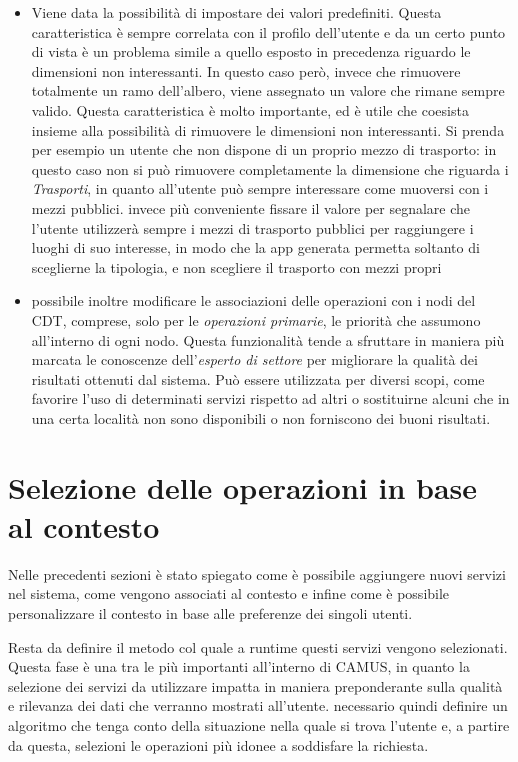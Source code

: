 \begin{itemize}
	\item
	Viene data la possibilità di impostare dei valori predefiniti. Questa caratteristica è sempre correlata con il profilo dell'utente e da un certo punto di vista è un problema simile a quello esposto in precedenza riguardo le dimensioni non interessanti. In questo caso però, invece che rimuovere totalmente un ramo dell'albero, viene assegnato un valore che rimane sempre valido. Questa caratteristica è molto importante, ed è utile che coesista insieme alla possibilità di rimuovere le dimensioni non interessanti. Si prenda per esempio un utente che non dispone di un proprio mezzo di trasporto: in questo caso non si può rimuovere completamente la dimensione che riguarda i \emph{Trasporti}, in quanto all'utente può sempre interessare come muoversi con i mezzi pubblici. \upe invece più conveniente fissare il valore  per segnalare che l'utente utilizzerà sempre i mezzi di trasporto pubblici per raggiungere i luoghi di suo interesse, in modo che la app generata permetta soltanto di sceglierne la tipologia, e non scegliere il trasporto con mezzi propri
	\item
	\upe possibile inoltre modificare le associazioni delle operazioni con i nodi del CDT, comprese, solo per le \emph{operazioni primarie}, le priorità che assumono all'interno di ogni nodo. Questa funzionalità tende a sfruttare in maniera più marcata le conoscenze dell'\emph{esperto di settore} per migliorare la qualità dei risultati ottenuti dal sistema. Può essere utilizzata per diversi scopi, come favorire l'uso di determinati servizi rispetto ad altri o sostituirne alcuni che in una certa località non sono disponibili o non forniscono dei buoni risultati.
\end{itemize}

\section{Selezione delle operazioni in base al contesto\label{sec:selezione-operazioni}}

Nelle precedenti sezioni è stato spiegato come è possibile aggiungere nuovi servizi nel sistema, come vengono associati al contesto e infine come è possibile personalizzare il contesto in base alle preferenze dei singoli utenti.

Resta da definire il metodo col quale a runtime questi servizi vengono selezionati. Questa fase è una tra le più importanti all'interno di CAMUS, in quanto la selezione dei servizi da utilizzare impatta in maniera preponderante sulla qualità e rilevanza dei dati che verranno mostrati all'utente. \upe necessario quindi definire un algoritmo che tenga conto della situazione nella quale si trova l'utente e, a partire da questa, selezioni le operazioni più idonee a soddisfare la richiesta. 

